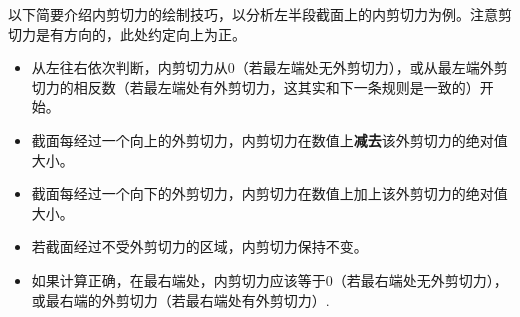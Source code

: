 以下简要介绍内剪切力的绘制技巧，以分析左半段截面上的内剪切力为例。注意剪切力是有方向的，此处约定向上为正。
\begin{itemize}
\item 从左往右依次判断，内剪切力从$0$（若最左端处无外剪切力），或从最左端外剪切力的相反数（若最左端处有外剪切力，这其实和下一条规则是一致的）开始。
\item 截面每经过一个向上的外剪切力，内剪切力在数值上\textbf{减去}该外剪切力的绝对值大小。
\item 截面每经过一个向下的外剪切力，内剪切力在数值上加上该外剪切力的绝对值大小。
\item 若截面经过不受外剪切力的区域，内剪切力保持不变。
\item 如果计算正确，在最右端处，内剪切力应该等于$0$（若最右端处无外剪切力），或最右端的外剪切力（若最右端处有外剪切力）.
\end{itemize}
